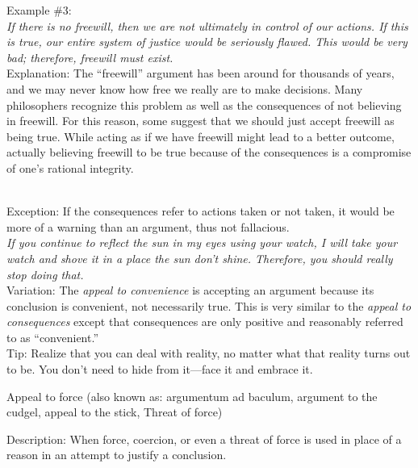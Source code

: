 \documentclass[a4paper,12pt,single,pdftex]{scrbook}
\begin{document}
{    
      Example \#3:
    \\

    
      {\em If there is no freewill, then we are not ultimately in control of our actions. If this is true, our entire system of justice would be seriously flawed. This would be very bad; therefore, freewill must exist.}
    \\

    
      Explanation: The “freewill” argument has been around for thousands of years, and we may never know how free we really are to make decisions. Many philosophers recognize this problem as well as the consequences of not believing in freewill. For this reason, some suggest that we should just accept freewill as being true. While acting as if we have freewill might lead to a better outcome, actually believing freewill to be true because of the consequences is a compromise of one’s rational integrity. \newline

    \\

    
      Exception: If the consequences refer to actions taken or not taken, it would be more of a warning than an argument, thus not fallacious.
    \\

    
      {\em If you continue to reflect the sun in my eyes using your watch, I will take your watch and shove it in a place the sun don’t shine. Therefore, you should really stop doing that.}
    \\

    
      Variation: The {\em appeal to convenience} is accepting an argument because its conclusion is convenient, not necessarily true. This is very similar to the {\em appeal to consequences} except that consequences are only positive and reasonably referred to as “convenient.”
    \\

    
      Tip: Realize that you can deal with reality, no matter what that reality turns out to be.  You don’t need to hide from it—face it and embrace it.
    \\

  }


Appeal to force
    (also known as: argumentum ad baculum, argument to the cudgel, appeal to the stick, Threat of force)
  
    Description:  When force, coercion, or even a threat of force is used in place of a reason in an attempt to justify a conclusion.
\end{document}
